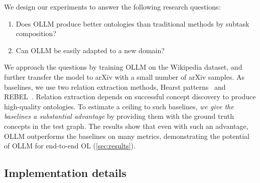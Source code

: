 \documentclass{article}
\newcommand{\name}{{OLLM}\xspace}
\begin{document}
We design our experiments to answer the following research questions:
\begin{enumerate}[itemsep=0pt,leftmargin=*]
    \item Does \name produce better ontologies than traditional methods by subtask composition?
    \item Can \name be easily adapted to a new domain?
\end{enumerate}
We approach the questions by training \name on the Wikipedia dataset, and further transfer the model to arXiv with a small number of arXiv samples. As baselines, we use two relation extraction methods, Hearst patterns~\cite{hearst1998automated,roller2018hearst} and REBEL~\cite{cabot2021rebel}. Relation extraction depends on successful concept discovery to produce high-quality ontologies. To estimate a ceiling to such baselines, \emph{we give the baselines a substantial advantage} by providing them with the ground truth concepts in the test graph. The results show that even with such an advantage, \name outperforms the baselines on many metrics, demonstrating the potential of \name for end-to-end OL (\cref{sec:results}).

\subsection{Implementation details}  \label{sec:implementation}




\end{document}
